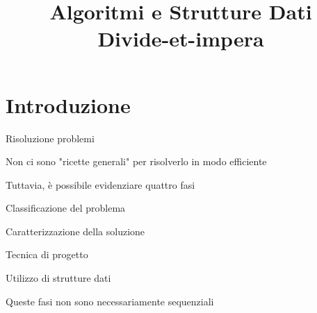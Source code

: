
\title[ASD - Divide-et-impera]{\textbf{Algoritmi e Strutture Dati}\\[24pt]Divide-et-impera}

\usepackage{tikz}
\usepackage{xmpmulti}
\usepackage{listings}


\graphicspath{{figs/12/}}



\FrameTitle{}

\FrameContent


\section{Introduzione}



\begin{frame}{Risoluzione problemi}

\vspace{-9pt}
\BIL
\item Non ci sono "ricette generali" per risolverlo in modo efficiente
\item Tuttavia, è possibile evidenziare quattro fasi
\BI
\item \alert{Classificazione del problema}
\item \alert{Caratterizzazione della soluzione}
\item \alert{Tecnica di progetto}
\item \alert{Utilizzo di strutture dati}
\EI
\item Queste fasi non sono necessariamente sequenziali
\EIL

\end{frame}


